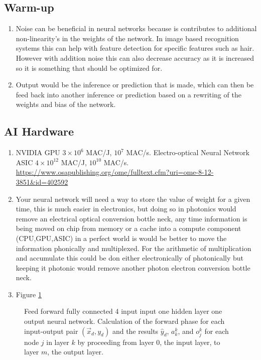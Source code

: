 \documentclass[main.tex]{subfiles}
\begin{document}
\subsection{Warm-up}
    \begin{enumerate}
        \item Noise can be beneficial in neural networks because is contributes to additional non-linearity's in the weights of the network. In image based recognition systems this can help with feature detection for specific features such as hair. However with addition noise this can also decrease accuracy as it is increased so it is something that should be optimized for.
        \item Output would be the inference or prediction that is made, which can then be feed back into another inference or prediction based on a rewriting of the weights and bias of the network.
    \end{enumerate}
\subsection{AI Hardware}
    \begin{enumerate}
        \item NVIDIA GPU $3\times10^6$ MAC/J, $10^7$ MAC/s. Electro-optical Neural Network ASIC $4\times10^12$ MAC/J, $10^10$ MAC/s. \url{https://www.osapublishing.org/ome/fulltext.cfm?uri=ome-8-12-3851&id=402592}
        \item Your neural network will need a way to store the value of weight for a given time, this is much easier in electronics, but doing so in photonics would remove an electrical optical conversion bottle neck, any time information is being moved on chip from memory or a cache into a compute component (CPU,GPU,ASIC) in a perfect world is would be better to move the information phonically and multiplexed. For the arithmetic of multiplication and accumulate this could be don either electronically of photonically but keeping it photonic would remove another photon electron conversion bottle neck. 
        \item Figure \ref{fig:nn architecture}
    \end{enumerate}

    \begin{figure}
    \centering{}
    \caption{Feed forward fully connected 4 input input one hidden layer one output neural network. Calculation of the forward phase for each input-output pair $\left(\vec{x}_{d}, y_{d}\right)$ and the results $\hat{y}_d$, $a_k^k$, and $o_{j}^{k}$ for each node $j$ in layer $k$ by proceeding from layer 0, the input layer, to layer $m$, the output layer.}
    \label{fig:nn architecture}
    \end{figure}
\end{document}
